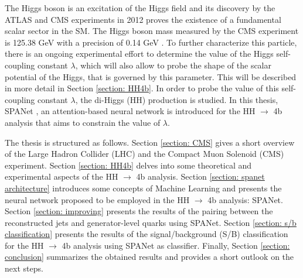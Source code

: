 The Higgs boson is an excitation of the Higgs field and its discovery by the ATLAS \cite{ATLASdecouvhiggs} and CMS \cite{CMShiggsdecouv} experiments in 2012 proves the existence of a fundamental scalar sector in the SM. The Higgs boson mass measured by the CMS experiment is 125.38 GeV with a precision of 0.14 GeV \cite{PreciseCMSmeasHiggs}. To further characterize this particle, there is an ongoing experimental effort to determine the value of the Higgs self-coupling constant $\lambda$, which will also allow to probe the shape of the scalar potential of the Higgs, that is governed by this parameter. This will be described in more detail in Section \ref{section: HH4b}. In order to probe the value of this self-coupling constant $\lambda$, the di-Higgs (HH) production is studied. In this thesis, SPANet \cite{SPANet}, an attention-based neural network is introduced for the HH $\to$ 4b analysis that aims to constrain the value of $\lambda$. 

The thesis is structured as follows. Section \ref{section: CMS} gives a short overview of the Large Hadron Collider (LHC) and the Compact Muon Solenoid (CMS) experiment. Section \ref{section: HH4b} delves into some theoretical and experimental aspects of the HH $\to$ 4b analysis. Section \ref{section: spanet architecture} introduces some concepts of Machine Learning and presents the neural network proposed to be employed in the HH $\to$ 4b analysis: SPANet. Section \ref{section: improving} presents the results of the pairing between the reconstructed jets and generator-level quarks using SPANet. Section \ref{section: s/b classification} presents the results of the signal/background (S/B) classification for the HH $\to$ 4b analysis using SPANet as classifier. Finally, Section \ref{section: conclusion} summarizes the obtained results and provides a short outlook on the next steps.



